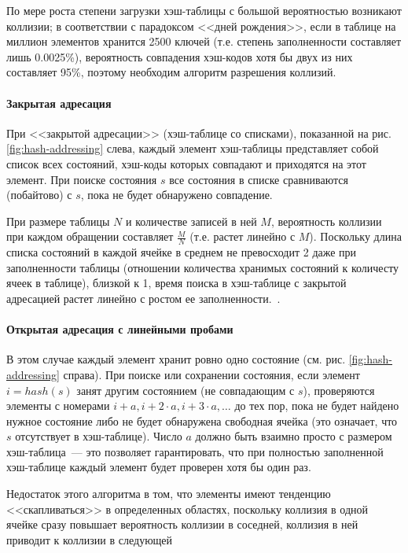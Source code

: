 По мере роста степени загрузки хэш-таблицы с большой вероятностью возникают коллизии; в
соответствии с парадоксом <<дней рождения>>, если в таблице на миллион элементов хранится
2500 ключей (т.е. степень заполненности составляет лишь 0.0025\%), вероятность совпадения
хэш-кодов хотя бы двух из них составляет 95\%, поэтому необходим алгоритм разрешения
коллизий.

\paragraph{Закрытая адресация}
\label{sec:closed-addressing}

При <<закрытой адресации>> (хэш-таблице со списками), показанной на
рис. \ref{fig:hash-addressing} слева, каждый элемент хэш-таблицы представляет собой список
всех состояний, хэш-коды которых совпадают и приходятся на этот элемент. При поиске
состояния $s$ все состояния в списке сравниваются (побайтово) с $s$, пока не будет
обнаружено совпадение.

При размере таблицы $N$ и количестве записей в ней $M$, вероятность коллизии при каждом
обращении составляет $\frac{M}{N}$ (т.е. растет линейно с $M$). Поскольку длина списка
состояний в каждой ячейке в среднем не превосходит 2 даже при заполненности таблицы
(отношении количества хранимых состояний к количесту ячеек в таблице), близкой к 1, время
поиска в хэш-таблице с закрытой адресацией растет линейно с ростом ее
заполненности.~\cite{CDataStructures}.

\paragraph{Открытая адресация с линейными пробами}
\label{sec:open-linear-probing}

В этом случае каждый элемент хранит ровно одно состояние
(см. рис. \ref{fig:hash-addressing} справа). При поиске или сохранении состояния, если
элемент $i = hash(s)$ занят другим состоянием (не совпадающим с $s$), проверяются элементы
с номерами $i + a, i + 2 \cdot a, i + 3 \cdot a, \ldots$ до тех пор, пока не будет найдено
нужное состояние либо не будет обнаружена свободная ячейка (это означает, что $s$
отсутствует в хэш-таблице). Число $a$ должно быть взаимно просто с размером
хэш-таблица~--- это позволяет гарантировать, что при полностью заполненной хэш-таблице
каждый элемент будет проверен хотя бы один раз.

Недостаток этого алгоритма в том, что элементы имеют тенденцию <<скапливаться>> в
определенных областях, поскольку коллизия в одной ячейке сразу повышает вероятность
коллизии в соседней, коллизия в ней приводит к коллизии в следующей\etc

